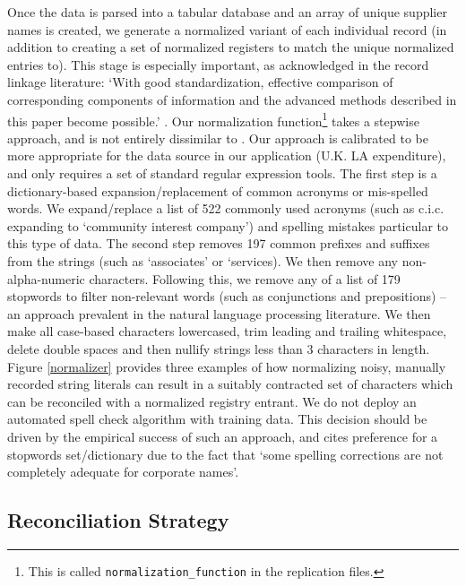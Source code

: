 \documentclass[12pt]{article}
\begin{document}
Once the data is parsed into a tabular database and an array of unique supplier names is created, we generate a normalized variant of each individual record (in addition to creating a set of normalized registers to match the unique normalized entries to). This stage is especially important, as acknowledged in the record linkage literature: `With good standardization, effective comparison of corresponding components of information and the advanced methods described in this paper become possible.' \citep[p.190]{Porter97approximatestring}. Our normalization function\footnote{This is called \texttt{normalization\_function} in the replication files.} takes a stepwise approach, and is not entirely dissimilar to \cite{corfu2015}. Our approach is calibrated to be more appropriate for the data source in our application (U.K. LA expenditure), and only requires a set of standard regular expression tools. The first step is a dictionary-based expansion/replacement of common acronyms or mis-spelled words. We expand/replace a list of 522 commonly used acronyms (such as c.i.c. expanding to `community interest company') and spelling mistakes particular to this type of data. The second step removes 197 common prefixes and suffixes from the strings (such as `associates' or `services). We then remove any non-alpha-numeric characters. Following this, we remove any of a list of 179 stopwords to filter non-relevant words (such as conjunctions and prepositions) -- an approach prevalent in the natural language processing literature. We then make all case-based characters lowercased, trim leading and trailing whitespace, delete double spaces and then nullify strings less than 3 characters in length. Figure \ref{normalizer} provides three examples of how normalizing noisy, manually recorded string literals can result in a suitably contracted set of characters which can be reconciled with a normalized registry entrant. We do not deploy an automated spell check algorithm with training data. This decision should be driven by the empirical success of such an approach, and \cite{corfu2015} cites preference for a stopwords set/dictionary due to the fact that `some spelling corrections are not completely adequate for corporate names'.

\subsection{Reconciliation Strategy}\label{stringmatching}
\end{document}
